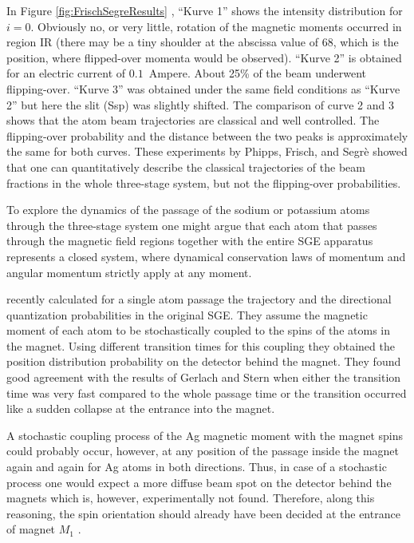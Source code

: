 \documentclass{article}
\begin{document}
In Figure \ref{fig:FrischSegreResults} , ``Kurve 1'' shows the intensity distribution for $i=0$. Obviously no, or very little, rotation of the magnetic moments occurred in region IR (there may be a tiny shoulder at the abscissa value of $68$, which is the position, where flipped-over momenta would be observed). ``Kurve 2'' is obtained for an electric current of $0.1$~Ampere. About 25\% of the beam underwent flipping-over. ``Kurve 3'' was obtained under the same field conditions as ``Kurve 2'' but here the slit (Ssp) was slightly shifted. The comparison of curve 2 and 3 shows that the atom beam trajectories are classical and well controlled. The flipping-over probability and the distance between the two peaks is approximately the same for both curves. These experiments by Phipps, Frisch, and Segrè showed that one can quantitatively describe the classical trajectories of the beam fractions in the whole three-stage system, but not the flipping-over probabilities. 

To explore the dynamics of the passage of the sodium or potassium atoms through the three-stage system one might argue that each atom that passes through the magnetic field regions together with the entire SGE apparatus represents a closed system, where dynamical conservation laws of momentum and angular momentum strictly apply at any moment. 

\cite{WennerstroemHEtal2012experiment,WennerstroemHEtal2013measurements,WennerstroemHEtal2014Interpretation} recently calculated for a single atom passage the trajectory and the directional quantization probabilities in the original SGE. 
They assume the magnetic moment of each atom to be stochastically coupled to the spins of the atoms in the magnet. Using different transition times for this coupling they obtained the position distribution probability on the detector behind the magnet. They found good agreement with the results of Gerlach and Stern when either the transition time was very fast compared to the whole passage time or the transition occurred like a sudden collapse at the entrance into the magnet.  

A stochastic coupling process of the Ag magnetic moment with the magnet spins could probably occur, however, at any position of the passage inside the magnet again and again for Ag atoms in both directions. Thus, in case of a stochastic process one would expect a more diffuse beam spot on the detector behind the magnets which is, however, experimentally not found. Therefore, along this reasoning, the spin orientation should already have been decided at the entrance of magnet $M_1$ .
\end{document}
